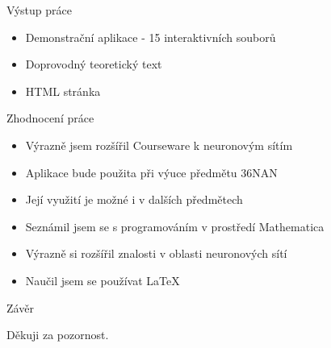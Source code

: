 \documentclass{beamer}
\begin{document}
\begin{frame}{Výstup práce}
\begin{itemize}
\item Demonstrační aplikace - 15 interaktivních souborů
\item Doprovodný teoretický text
\item HTML stránka
\end{itemize}
\end{frame}

\begin{frame}{Zhodnocení práce}
\begin{itemize}
\item Výrazně jsem rozšířil Courseware k neuronovým sítím
\item Aplikace bude použita při výuce předmětu 36NAN
\item Její využití je možné i v dalších předmětech
\end{itemize}
\begin{itemize}
\item Seznámil jsem se s programováním v prostředí Mathematica
\item Výrazně si rozšířil znalosti v oblasti neuronových sítí
\item Naučil jsem se používat LaTeX
\end{itemize}
\end{frame}


\begin{frame}{Závěr}
\begin{center}
\begin{huge}
Děkuji za pozornost.
\end{huge}
\end{center}

\end{frame}
\end{document}
